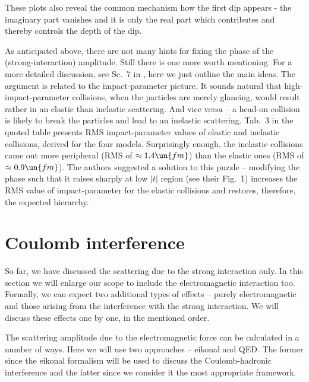 These plots also reveal the common mechanism how the first dip appears - the imaginary part vanishes and it is only the real part which contributes and thereby controls the depth of the dip.



As anticipated above, there are not many hints for fixing the phase of the (strong-interaction) amplitude. Still there is one more worth mentioning. For a more detailed discussion, see Sc.~7 in , here we just outline the main ideas. The argument is related to the impact-parameter picture. It sounds natural that high-impact-parameter collisions, when the particles are merely glancing, would result rather in an elastic than inelastic scattering. And vice versa -- a head-on collision is likely to break the particles and lead to an inelastic scattering. Tab.~3 in the quoted table presents RMS impact-parameter values of elastic and inelastic collisions, derived for the four models. Surprisingly enough, the inelastic collisions came out more peripheral (RMS of $\approx 1.4\un{fm}$) than the elastic ones (RMS of $\approx 0.9\un{fm}$). The authors suggested a solution to this puzzle -- modifying the phase such that it raises sharply at low $|t|$ region (see their Fig.~1) increases the RMS value of impact-parameter for the elastic collisions and restores, therefore, the expected hierarchy.

\section[el coulomb]{Coulomb interference}

So far, we have discussed the scattering due to the strong interaction only. In this section we will enlarge our scope to include the electromagnetic interaction too. Formally, we can expect two additional types of effects -- purely electromagnetic and those arising from the interference with the strong interaction. We will discuss these effects one by one, in the mentioned order.

The scattering amplitude due to the electromagnetic force can be calculated in a number of ways. Here we will use two approaches -- eikonal and QED. The former since the eikonal formalism will be used to discuss the Coulomb-hadronic interference and the latter since we consider it the most appropriate framework.

